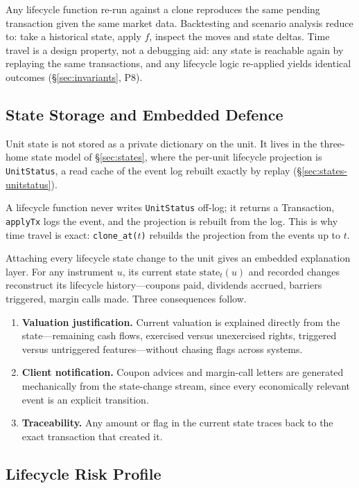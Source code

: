 \documentclass[11pt,a4paper]{article}
\begin{document}
\noindent Any lifecycle function re-run against a clone reproduces the same pending transaction given the same market data. Backtesting and scenario analysis reduce to: take a historical state, apply $f$, inspect the moves and state deltas. Time travel is a design property, not a debugging aid: any state is reachable again by replaying the same transactions, and any lifecycle logic re-applied yields identical outcomes (\S\ref{sec:invariants}, P8).

\subsection{State Storage and Embedded Defence}

Unit state is not stored as a private dictionary on the unit. It lives in the three-home state model of \S\ref{sec:states}, where the per-unit lifecycle projection is \texttt{UnitStatus}, a read cache of the event log rebuilt exactly by replay (\S\ref{sec:states-unitstatus}).

\noindent A lifecycle function never writes \texttt{UnitStatus} off-log; it returns a Transaction, \texttt{applyTx} logs the event, and the projection is rebuilt from the log. This is why time travel is exact: \texttt{clone\_at($t$)} rebuilds the projection from the events up to $t$.

Attaching every lifecycle state change to the unit gives an embedded explanation layer. For any instrument $u$, its current state $\text{state}_t(u)$ and recorded changes reconstruct its lifecycle history---coupons paid, dividends accrued, barriers triggered, margin calls made. Three consequences follow.

\begin{enumerate}[nosep]
\item \textbf{Valuation justification.} Current valuation is explained directly from the state---remaining cash flows, exercised versus unexercised rights, triggered versus untriggered features---without chasing flags across systems.
\item \textbf{Client notification.} Coupon advices and margin-call letters are generated mechanically from the state-change stream, since every economically relevant event is an explicit transition.
\item \textbf{Traceability.} Any amount or flag in the current state traces back to the exact transaction that created it.
\end{enumerate}

\subsection{Lifecycle Risk Profile}
\label{sec:risk-profile}
\end{document}
